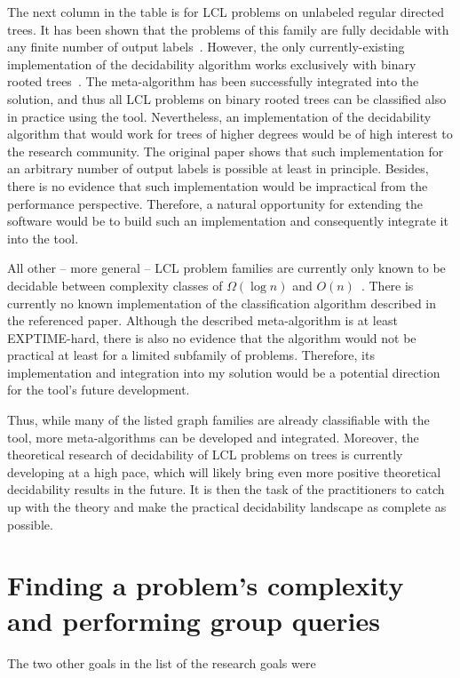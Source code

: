 The next column in the table is for LCL problems on unlabeled regular directed
trees. It has been shown that the problems of this family are fully decidable
with any finite number of output labels~\cite{Balliu2021}. However, the
only currently-existing implementation of the decidability algorithm
works exclusively with binary rooted trees~\cite{Studeny2021}. The
meta-algorithm has been successfully integrated into the solution, and
thus all LCL problems on binary rooted trees can be classified also in
practice using the tool. Nevertheless, an implementation of the
decidability algorithm that would work for trees of higher degrees
would be of high interest to the research community. The original
paper shows that such implementation for an arbitrary number of output
labels is possible at least in principle. Besides, there is no
evidence that such implementation would be impractical from the
performance perspective. Therefore, a natural opportunity for
extending the software would be to build such an implementation and
consequently integrate it into the tool.

All other -- more general -- LCL problem families
are currently only known to be decidable between complexity classes of
$\Omega(\log n)$ and $O(n)$~\cite{Chang2020a}. There is currently
no known implementation of the classification algorithm described in the
referenced paper. Although the described meta-algorithm is at least
EXPTIME-hard, there is also no evidence that the algorithm would not be
practical at least for a limited subfamily of problems. Therefore, its
implementation and integration into my solution would be a potential
direction for the tool's future development.

Thus, while many of the listed graph families are already classifiable
with the tool, more meta-algorithms can be developed
and integrated. Moreover, the theoretical
research of decidability of LCL problems on trees is currently
developing at a high pace, which will likely bring even more
positive theoretical decidability results in the future.
It is then the task of the practitioners to catch up with
the theory and make the practical decidability landscape
as complete as possible.

\section{Finding a problem's complexity and performing group queries}

The two other goals in the list of the research goals were

